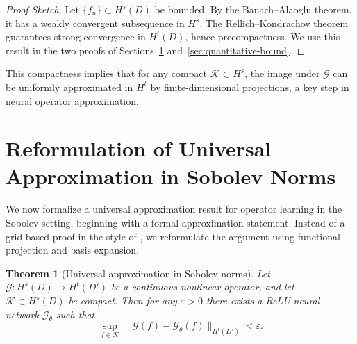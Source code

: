 \documentclass[11pt]{article}
\theoremstyle{plain}
\newtheorem{theorem}{Theorem}
\theoremstyle{definition}
\theoremstyle{remark}
\begin{document}
\begin{proof}[Proof Sketch]
Let $\{f_n\} \subset H^s(D)$ be bounded. By the Banach--Alaoglu theorem, it has a weakly convergent subsequence in $H^s$. The Rellich--Kondrachov theorem
guarantees strong convergence in $H^t(D)$, hence precompactness. We use this result in the two proofs of Sections~\ref{section4} and~\ref{sec:quantitative-bound}.
\end{proof}

\noindent
This compactness implies that for any compact $\mathcal{K} \subset H^s$, the image under $\mathcal{G}$ can be uniformly approximated in $H^t$ by finite-dimensional projections, a key step in neural operator approximation.

\section{Reformulation of Universal Approximation in Sobolev Norms}
\label{section4}
We now formalize a universal approximation result for operator learning in the Sobolev setting, beginning with a formal approximation statement. Instead of a grid-based proof in the style of \citet[Theorem
3.10]{le2024mathematicalanalysisneuraloperator}, we reformulate the argument using functional projection and basis expansion.

\begin{theorem}[Universal approximation in Sobolev norms]
\label{thm:universal}
Let $\mathcal{G}: H^s(D) \to H^t(D')$ be a continuous nonlinear operator, and let $\mathcal{K} \subset H^s(D)$ be compact. Then for any $\varepsilon > 0$ there exists a ReLU neural network $\mathcal{G}_\theta$ such that
\[
\sup_{f \in \mathcal{K}} \| \mathcal{G}(f) - \mathcal{G}_\theta(f)
\|_{H^t(D')} < \varepsilon.
\]
\end{theorem}
\end{document}
